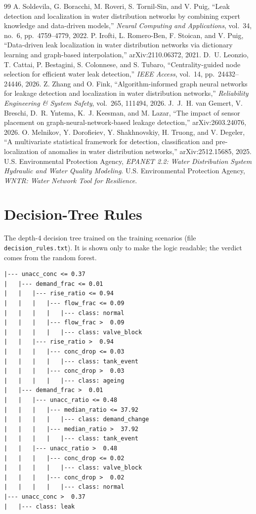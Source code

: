 \documentclass[11pt,letterpaper]{report}
\theoremstyle{definition}
\theoremstyle{plain}
\theoremstyle{remark}
\begin{document}
\begin{thebibliography}{99}
 A. Soldevila, G. Boracchi, M. Roveri, S. Tornil-Sin, and V. Puig, ``Leak detection and localization in water distribution networks by combining expert knowledge and data-driven models,'' \textit{Neural Computing and Applications}, vol.~34, no.~6, pp.~4759--4779, 2022.
 P. Irofti, L. Romero-Ben, F. Stoican, and V. Puig, ``Data-driven leak localization in water distribution networks via dictionary learning and graph-based interpolation,'' arXiv:2110.06372, 2021.
 D.~U. Leonzio, T. Cattai, P. Bestagini, S. Colonnese, and S. Tubaro, ``Centrality-guided node selection for efficient water leak detection,'' \textit{IEEE Access}, vol.~14, pp.~24432--24446, 2026.
 Z. Zhang and O. Fink, ``Algorithm-informed graph neural networks for leakage detection and localization in water distribution networks,'' \textit{Reliability Engineering \& System Safety}, vol.~265, 111494, 2026.
 J.~J.~H. van Gemert, V. Breschi, D.~R. Yntema, K.~J. Keesman, and M. Lazar, ``The impact of sensor placement on graph-neural-network-based leakage detection,'' arXiv:2603.24076, 2026.
 O. Melnikov, Y. Dorofieiev, Y. Shakhnovskiy, H. Truong, and V. Degeler, ``A multivariate statistical framework for detection, classification and pre-localization of anomalies in water distribution networks,'' arXiv:2512.15685, 2025.
 U.S. Environmental Protection Agency, \textit{EPANET 2.2: Water Distribution System Hydraulic and Water Quality Modeling}.
 U.S. Environmental Protection Agency, \textit{WNTR: Water Network Tool for Resilience}.
\end{thebibliography}

\appendix
\chapter{Decision-Tree Rules}\label{app:rules}
The depth-4 decision tree trained on the training scenarios (file \texttt{decision\_rules.txt}). It is shown only to make the logic readable; the verdict comes from the random forest.
\begin{lstlisting}
|--- unacc_conc <= 0.37
|   |--- demand_frac <= 0.01
|   |   |--- rise_ratio <= 0.94
|   |   |   |--- flow_frac <= 0.09
|   |   |   |   |--- class: normal
|   |   |   |--- flow_frac >  0.09
|   |   |   |   |--- class: valve_block
|   |   |--- rise_ratio >  0.94
|   |   |   |--- conc_drop <= 0.03
|   |   |   |   |--- class: tank_event
|   |   |   |--- conc_drop >  0.03
|   |   |   |   |--- class: ageing
|   |--- demand_frac >  0.01
|   |   |--- unacc_ratio <= 0.48
|   |   |   |--- median_ratio <= 37.92
|   |   |   |   |--- class: demand_change
|   |   |   |--- median_ratio >  37.92
|   |   |   |   |--- class: tank_event
|   |   |--- unacc_ratio >  0.48
|   |   |   |--- conc_drop <= 0.02
|   |   |   |   |--- class: valve_block
|   |   |   |--- conc_drop >  0.02
|   |   |   |   |--- class: normal
|--- unacc_conc >  0.37
|   |--- class: leak
\end{lstlisting}
\end{document}
